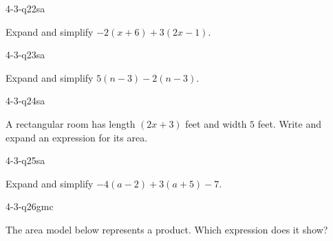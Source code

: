 \begin{practiceQuestion}{4-3-q22}{sa}
\begin{questionText}
Expand and simplify $-2(x + 6) + 3(2x - 1)$.
\end{questionText}
\end{practiceQuestion}

\begin{practiceQuestion}{4-3-q23}{sa}
\begin{questionText}
Expand and simplify $5(n - 3) - 2(n - 3)$.
\end{questionText}
\end{practiceQuestion}

\begin{practiceQuestion}{4-3-q24}{sa}
\begin{questionText}
A rectangular room has length $(2x + 3)$ feet and width $5$ feet. Write and expand an expression for its area.
\end{questionText}
\end{practiceQuestion}

\begin{practiceQuestion}{4-3-q25}{sa}
\begin{questionText}
Expand and simplify $-4(a - 2) + 3(a + 5) - 7$.
\end{questionText}
\end{practiceQuestion}


\begin{practiceQuestion}{4-3-q26}{gmc}
\begin{questionText}
The area model below represents a product. Which expression does it show?

\begin{center}
\end{center}
\end{questionText}
\end{practiceQuestion}

